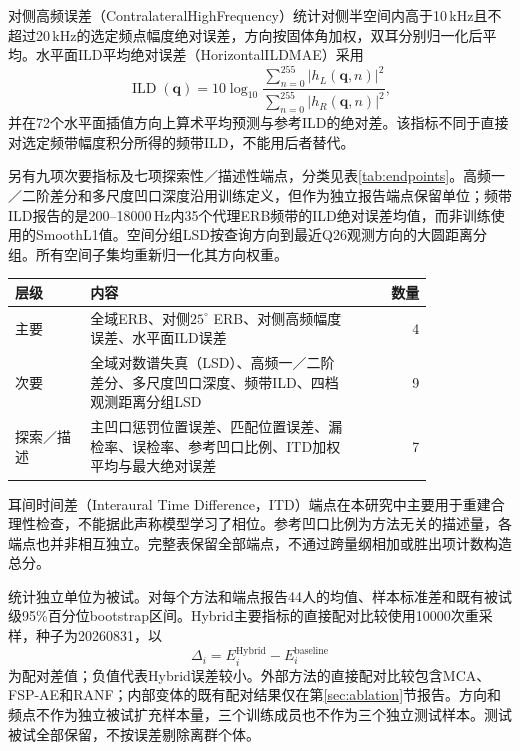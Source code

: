 对侧高频误差（ContralateralHighFrequency）统计对侧半空间内高于10\,kHz且不超过20\,kHz的选定频点幅度绝对误差，方向按固体角加权，双耳分别归一化后平均。水平面ILD平均绝对误差（HorizontalILDMAE）采用
\begin{equation}
\operatorname{ILD}(\mathbf q)=10\log_{10}
\frac{\sum_{n=0}^{255}|h_L(\mathbf q,n)|^2}
     {\sum_{n=0}^{255}|h_R(\mathbf q,n)|^2},
\end{equation}
并在72个水平面插值方向上算术平均预测与参考ILD的绝对差。该指标不同于直接对选定频带幅度积分所得的频带ILD，不能用后者替代。

另有九项次要指标及七项探索性／描述性端点，分类见表\ref{tab:endpoints}。高频一／二阶差分和多尺度凹口深度沿用训练定义，但作为独立报告端点保留单位；频带ILD报告的是200--18000\,Hz内35个代理ERB频带的ILD绝对误差均值，而非训练使用的SmoothL1值。空间分组LSD按查询方向到最近Q26观测方向的大圆距离分组。所有空间子集均重新归一化其方向权重。

\begin{table}[htbp]
\centering\small
{}
\begin{tabular}{p{0.18\linewidth}p{0.65\linewidth}r}
\toprule
层级 & 内容 & 数量\\
\midrule
主要 & 全域ERB、对侧$25^\circ$ ERB、对侧高频幅度误差、水平面ILD误差 & 4\\
次要 & 全域对数谱失真（LSD）、高频一／二阶差分、多尺度凹口深度、频带ILD、四档观测距离分组LSD & 9\\
探索／描述 & 主凹口惩罚位置误差、匹配位置误差、漏检率、误检率、参考凹口比例、ITD加权平均与最大绝对误差 & 7\\
\bottomrule
\end{tabular}
\end{table}

耳间时间差（Interaural Time Difference，ITD）端点在本研究中主要用于重建合理性检查，不能据此声称模型学习了相位。参考凹口比例为方法无关的描述量，各端点也并非相互独立。完整表保留全部端点，不通过跨量纲相加或胜出项计数构造总分。

统计独立单位为被试。对每个方法和端点报告44人的均值、样本标准差和既有被试级95\%百分位bootstrap区间。Hybrid主要指标的直接配对比较使用10000次重采样，种子为20260831，以
\begin{equation}
\Delta_i=E_i^{\mathrm{Hybrid}}-E_i^{\mathrm{baseline}}
\end{equation}
为配对差值；负值代表Hybrid误差较小。外部方法的直接配对比较包含MCA、FSP-AE和RANF；内部变体的既有配对结果仅在第\ref{sec:ablation}节报告。方向和频点不作为独立被试扩充样本量，三个训练成员也不作为三个独立测试样本。测试被试全部保留，不按误差剔除离群个体。

